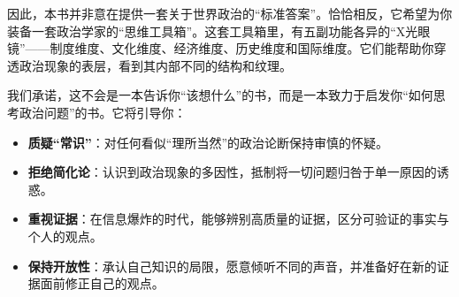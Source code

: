因此，本书并非意在提供一套关于世界政治的“标准答案”。恰恰相反，它希望为你装备一套政治学家的“思维工具箱”。这套工具箱里，有五副功能各异的“X光眼镜”——制度维度、文化维度、经济维度、历史维度和国际维度。它们能帮助你穿透政治现象的表层，看到其内部不同的结构和纹理。

我们承诺，这不会是一本告诉你“该想什么”的书，而是一本致力于启发你“如何思考政治问题”的书。它将引导你：
\begin{itemize}
    \item \textbf{质疑“常识”}：对任何看似“理所当然”的政治论断保持审慎的怀疑。
    \item \textbf{拒绝简化论}：认识到政治现象的多因性，抵制将一切问题归咎于单一原因的诱惑。
    \item \textbf{重视证据}：在信息爆炸的时代，能够辨别高质量的证据，区分可验证的事实与个人的观点。
    \item \textbf{保持开放性}：承认自己知识的局限，愿意倾听不同的声音，并准备好在新的证据面前修正自己的观点。
\end{itemize}

